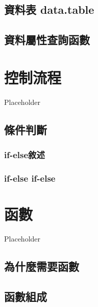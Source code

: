 \documentclass[
]{book}
\begin{document}
\hypertarget{ux8cc7ux6599ux8868-data.table}{%
\section{資料表 data.table}\label{ux8cc7ux6599ux8868-data.table}}

\hypertarget{ux8cc7ux6599ux5c6cux6027ux67e5ux8a62ux51fdux6578}{%
\section{資料屬性查詢函數}\label{ux8cc7ux6599ux5c6cux6027ux67e5ux8a62ux51fdux6578}}

\hypertarget{controlstructure}{%
\chapter{控制流程}\label{controlstructure}}

Placeholder

\hypertarget{ux689dux4ef6ux5224ux65b7}{%
\section{條件判斷}\label{ux689dux4ef6ux5224ux65b7}}

\hypertarget{if-elseux6558ux8ff0}{%
\subsection{if-else敘述}\label{if-elseux6558ux8ff0}}

\hypertarget{if-else-if-else}{%
\subsection{if-else if-else}\label{if-else-if-else}}

\hypertarget{function}{%
\chapter{函數}\label{function}}

Placeholder

\hypertarget{ux70baux4ec0ux9ebcux9700ux8981ux51fdux6578}{%
\section{為什麼需要函數}\label{ux70baux4ec0ux9ebcux9700ux8981ux51fdux6578}}

\hypertarget{ux51fdux6578ux7d44ux6210}{%
\section{函數組成}\label{ux51fdux6578ux7d44ux6210}}
\end{document}
